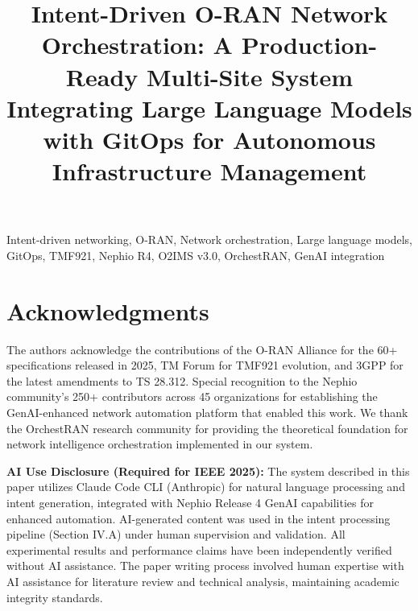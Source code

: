 \documentclass[conference]{IEEEtran}
\title{Intent-Driven O-RAN Network Orchestration: A Production-Ready Multi-Site System Integrating Large Language Models with GitOps for Autonomous Infrastructure Management}
\author{
\IEEEauthorblockN{Authors}
\IEEEauthorblockA{Affiliation\\
Email: anonymous@review.org}
}
\begin{document}
\maketitle



\begin{IEEEkeywords}
Intent-driven networking, O-RAN, Network orchestration, Large language models, GitOps, TMF921, Nephio R4, O2IMS v3.0, OrchestRAN, GenAI integration
\end{IEEEkeywords}









\section*{Acknowledgments}
The authors acknowledge the contributions of the O-RAN Alliance for the 60+ specifications released in 2025, TM Forum for TMF921 evolution, and 3GPP for the latest amendments to TS 28.312. Special recognition to the Nephio community's 250+ contributors across 45 organizations for establishing the GenAI-enhanced network automation platform that enabled this work. We thank the OrchestRAN research community for providing the theoretical foundation for network intelligence orchestration implemented in our system.

\textbf{AI Use Disclosure (Required for IEEE 2025):} The system described in this paper utilizes Claude Code CLI (Anthropic) for natural language processing and intent generation, integrated with Nephio Release 4 GenAI capabilities for enhanced automation. AI-generated content was used in the intent processing pipeline (Section IV.A) under human supervision and validation. All experimental results and performance claims have been independently verified without AI assistance. The paper writing process involved human expertise with AI assistance for literature review and technical analysis, maintaining academic integrity standards.



\end{document}
